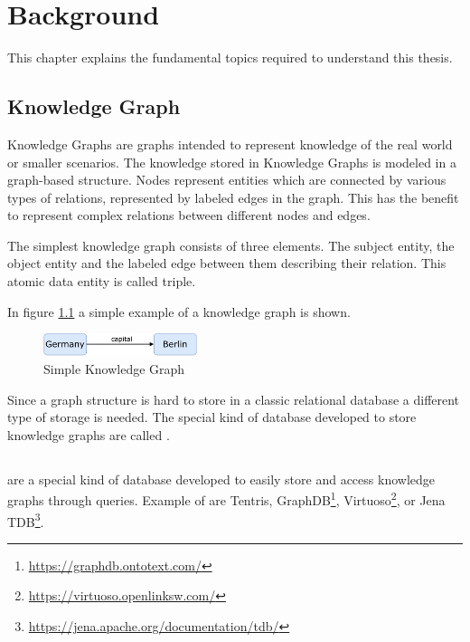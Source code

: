 \chapter{Background}
\label{ch:background}

This chapter explains the fundamental topics required to understand this thesis.

\section{Knowledge Graph} 
\label{sec:knowledge_graph}
Knowledge Graphs are graphs intended to represent knowledge of the real world or smaller scenarios.
The knowledge stored in Knowledge Graphs is modeled in a graph-based structure. 
Nodes represent entities which are connected by various types of relations, represented by labeled edges in the graph.
This has the benefit to represent complex relations between different nodes and edges\cite{hoganKnowledgeGraphs2021}.

The simplest knowledge graph consists of three elements.
The subject entity, the object entity and the labeled edge between them describing their relation.
This atomic data entity is called triple.

In figure \ref{fig:example-knowledge-graph} a simple example of a knowledge graph is shown.

\begin{figure}[tbph]
	\centering
	\includegraphics[width=0.4\textwidth]{figures/knowledge-graph-diagram}
	\caption{Simple Knowledge Graph}
	\label{fig:example-knowledge-graph}
\end{figure}

Since a graph structure is hard to store in a classic relational database a different type of storage is needed.
The special kind of database developed to store knowledge graphs are called \tsp{}.


\section{\ts{}}
\label{sec:triplestores}
\tsp{} are a special kind of database developed to easily store and access knowledge graphs through queries.
Example of \tsp{} are Tentris\cite{bigerlTentrisTensorBasedTriple2020}, GraphDB\footnote{\url{https://graphdb.ontotext.com/}}, Virtuoso\footnote{\url{https://virtuoso.openlinksw.com/}}, or Jena TDB\footnote{\url{https://jena.apache.org/documentation/tdb/}}.

